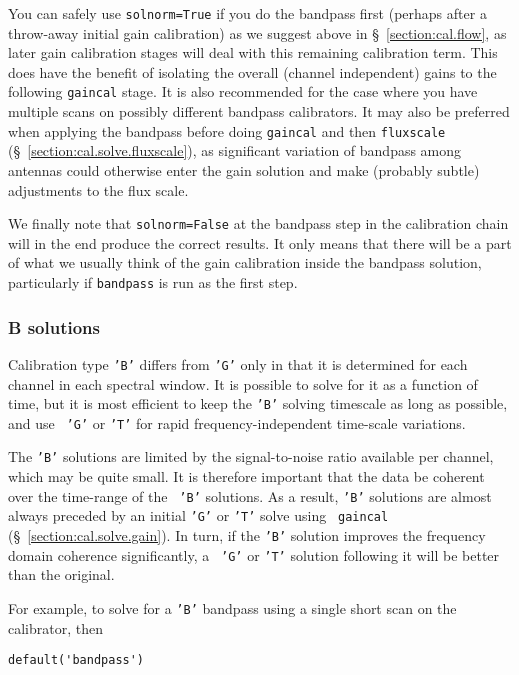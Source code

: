 {You can safely use {\tt solnorm=True} if you do the bandpass first
(perhaps after a throw-away initial gain calibration) as we suggest above in
\S~\ref{section:cal.flow}, as later gain calibration stages will deal with this
remaining calibration term.  This does have the benefit of isolating
the overall (channel independent) gains to the following {\tt gaincal}
stage.  It is also recommended for the case where you have multiple
scans on possibly different bandpass calibrators.  It may also be 
preferred when applying the bandpass before doing {\tt gaincal} and 
then {\tt fluxscale} (\S~\ref{section:cal.solve.fluxscale}), 
as significant variation of bandpass among antennas could otherwise 
enter the gain solution and make (probably subtle) adjustments to the
flux scale.

We finally note that {\tt solnorm=False} at the bandpass step in the
calibration chain will in the end produce the correct results.  It
only means that there will be a part of what we usually think of the
gain calibration inside the bandpass solution, particularly if
{\tt bandpass} is run as the first step.

\subsubsection{B solutions}
\label{section:cal.solve.band.b}

Calibration type {\tt 'B'} differs from {\tt 'G'} only in that it is
determined for each channel in each spectral window.  It is possible
to solve for it as a function of time, but it is most efficient to
keep the {\tt 'B'} solving timescale as long as possible, and use {\tt
'G'} or {\tt 'T'} for rapid frequency-independent time-scale variations.

The {\tt 'B'} solutions are limited by the signal-to-noise ratio
available per channel, which may be quite small.  It is therefore
important that the data be coherent over the time-range of the {\tt
'B'} solutions.  As a result, {\tt 'B'} solutions are almost always
preceded by an initial {\tt 'G'} or {\tt 'T'} solve using {\tt
gaincal} (\S~\ref{section:cal.solve.gain}).  In turn, if the {\tt 'B'}
solution improves the frequency domain coherence significantly, a {\tt
'G'} or {\tt 'T'} solution following it will be better than the
original.

For example, to solve for a {\tt 'B'} bandpass using a single short
scan on the calibrator, then
\small
\begin{verbatim}
default('bandpass')


\end{verbatim}}
